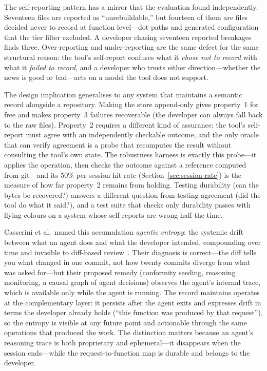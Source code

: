 The self-reporting pattern has a mirror that the evaluation found independently.
Seventeen files are reported as ``unrebuildable,'' but fourteen of them are files
\sgt{} decided never to record at function level---dot-paths and generated
configuration that the tier filter excluded. A developer chasing seventeen
reported breakages finds three. Over-reporting and under-reporting are the same
defect for the same structural reason: the tool's self-report confuses what it
\emph{chose not to record} with what it \emph{failed to record}, and a developer
who trusts either direction---whether the news is good or bad---acts on a model
the tool does not support.

The design implication generalises to any system that maintains a semantic record
alongside a repository. Making the store append-only gives property~1 for free
and makes property~3 failures recoverable (the developer can always fall back to
the raw files). Property~2 requires a different kind of assurance: the tool's
self-report must agree with an independently checkable outcome, and the only
oracle that can verify agreement is a probe that recomputes the result without
consulting the tool's own state. The robustness harness is exactly this probe---it
applies the operation, then checks the outcome against a reference computed from
git---and its 50\% per-session hit rate (Section~\ref{sec:session-rate}) is the
measure of how far property~2 remains from holding. Testing durability (can the
bytes be recovered?) answers a different question from testing agreement (did the
tool do what it said?), and a test suite that checks only durability passes with
flying colours on a system whose self-reports are wrong half the time.

Casserini et al.\ named this accumulation \emph{agentic entropy}: the systemic
drift between what an agent does and what the developer intended, compounding over
time and invisible to diff-based review~\cite{casserini2026entropy}. Their
diagnosis is correct---the diff tells you what changed in one commit, not how twenty
commits diverge from what was asked for---but their proposed remedy (conformity
seeding, reasoning monitoring, a causal graph of agent decisions) observes the
agent's internal trace, which is available only while the agent is running. The
record \sgt{} maintains operates at the complementary layer: it persists after the
agent exits and expresses drift in terms the developer already holds (``this
function was produced by that request''), so the entropy is visible at any future
point and actionable through the same operations that produced the work. The
distinction matters because an agent's reasoning trace is both proprietary and
ephemeral---it disappears when the session ends---while the request-to-function map
is durable and belongs to the developer.

